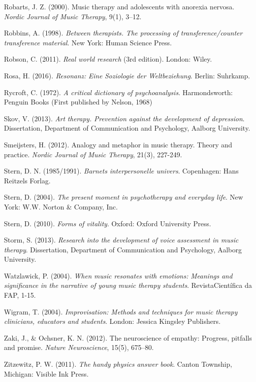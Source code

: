 \begin{thebibliography}{99}
\item Robarts, J. Z. (2000). Music therapy and adolescents with anorexia nervosa. \textit{Nordic Journal of Music Therapy}, 9(1), 3–12.
\item Robbins, A. (1998). \textit{Between therapists. The processing of transference/counter transference material}. New York: Human Science Press.
\item Robson, C. (2011). \textit{Real world research} (3rd edition). London: Wiley.
\item Rosa, H. (2016). \textit{Resonanz: Eine Soziologie der Weltbeziehung}. Berlin: Suhrkamp.
\item Rycroft, C. (1972). \textit{A critical dictionary of psychoanalysis}. Harmondsworth: Penguin Books (First published by Nelson, 1968)
\item Skov, V. (2013). \textit{Art therapy. Prevention against the development of depression}. Dissertation, Department of Communication and Psychology, Aalborg University.
\item Smeijsters, H. (2012). Analogy and metaphor in music therapy. Theory and practice. \textit{Nordic Journal of Music Therapy}, 21(3), 227-249.
\item Stern, D. N. (1985/1991). \textit{Barnets interpersonelle univers}. Copenhagen: Hans Reitzels Forlag.
\item Stern, D. (2004). \textit{The present moment in psychotherapy and everyday life}. New York: W.W. Norton \& Company, Inc.
\item Stern, D. (2010). \textit{Forms of vitality}. Oxford: Oxford University Press.
\item Storm, S. (2013). \textit{Research into the development of voice assessment in music therapy}. Dissertation, Department of Communication and Psychology, Aalborg University.
\item Watzlawick, P. (2004). \textit{When music resonates with emotions: Meanings and significance in the narrative of young music therapy students}. RevistaCientífica da FAP, 1-15.
\item Wigram, T. (2004). \textit{Improvisation: Methods and techniques for music therapy clinicians, educators and students}. London: Jessica Kingsley Publishers.
\item Zaki, J., \& Ochsner, K. N. (2012). The neuroscience of empathy: Progress, pitfalls and promise. \textit{Nature Neuroscience}, 15(5), 675–80.
\item Zitzewitz, P. W. (2011). \textit{The handy physics answer book}. Canton Township, Michigan: Visible Ink Press.

\end{thebibliography}